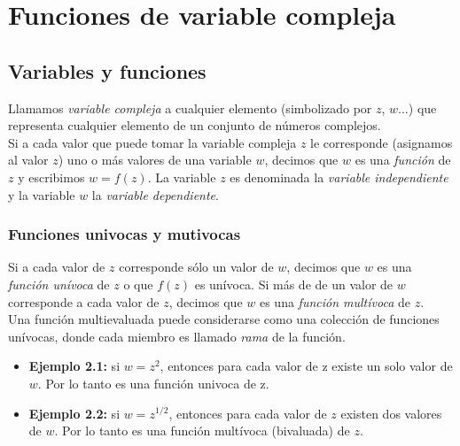 \documentclass[12pt,a4paper]{book}
\begin{document}
\chapter{Funciones de variable compleja}

\section{Variables y funciones}

Llamamos \textit{variable compleja} a cualquier elemento (simbolizado por $z$, $w \ldots$) que representa cualquier elemento de un conjunto de números complejos. \\

Si a cada valor que puede tomar la variable compleja $z$ le corresponde (asignamos al valor $z$) uno o más valores de una variable $w$, decimos que $w$ es una \textit{función} de $z$ y escribimos $w=f(z)$. La variable $z$ es denominada la \textit{variable independiente} y la variable $w$ la \textit{variable dependiente}.

\subsection{Funciones univocas y mutivocas}

Si a cada valor de $z$ corresponde sólo un valor de $w$, decimos que $w$ es una \textit{función unívoca} de $z$ o que $f(z)$ es unívoca. Si más de de un valor de $w$ corresponde a cada valor de $z$, decimos que $w$ es una \textit{función multívoca} de $z$. \\

Una función multievaluada puede considerarse como una colección de funciones unívocas, donde cada miembro es llamado \textit{rama} de la función.  \\



\hrulefill
\begin{itemize}

\item \textbf{Ejemplo 2.1:} si $w = z^2$, entonces para cada valor de z existe un solo valor de $w$. Por lo tanto es una función univoca de z.

\item \textbf{Ejemplo 2.2:} si $w = z^{1/2}$, entonces para cada valor de $z$ existen dos valores de $w$. Por lo tanto es una función multívoca (bivaluada) de $z$. 

\end{itemize}
\hrulefill \\
\end{document}

